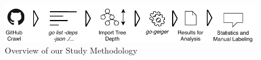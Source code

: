 \begin{figure}[ht]
    \includegraphics[width=\textwidth]{assets/figures/chapter1/study-methodology.pdf}
    \caption{Overview of our Study Methodology}
    \label{fig:study-methodology}
\end{figure}
